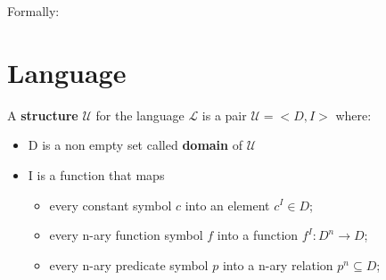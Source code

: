 \documentclass{article}
\begin{document}
\begin{comment}
    
\section{Interpretation and model in FOL}

A \textbf{model} in First Order Logic comprises the domain $D$ and an evaluation of everything but the variables. An \textbf{interpretation} gives value to variables (an element of the domain, not true/false like in propositional logic). \\

Formally: \\
Given a domain $D$, a model assigns:

\begin{itemize}
    \item an element of $D$ to each constant;
    \item a function $f: D^n \rightarrow D$ to each function symbol of arity $n$;
    \item a function $f: D^n \rightarrow \{true,\ false\}$ to each predicate symbol of arity $n$;
\end{itemize}

\begin{flushleft}
    An interpretation $\mu$ assigns an element of $D$ to every variable.
\end{flushleft}

\end{comment}

\newpage

Formally: \\

\section*{Language}

A \textbf{structure} $\mathcal{U}$ for the language $\mathcal{L}$ is a pair $\mathcal{U}=<D, I>$ where:
\begin{itemize}
    \item D is a non empty set called \textbf{domain} of $\mathcal{U}$
    \item I is a function that maps
    \begin{itemize}
        \item every constant symbol $c$ into an element $c^I \in D$;
        \item every n-ary function symbol $f$ into a function $f^I: D^n \rightarrow D$;
        \item every n-ary predicate symbol $p$ into a n-ary relation $p^n \subseteq D$;
    \end{itemize}
\end{itemize}
\end{document}
